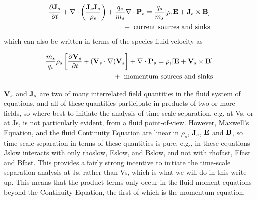\begin{eqnarray}
{\partial {\bf J}_{s} \over \partial t} + \nabla \cdot \left( {{\bf J}_{s} {\bf J}_{s} \over \rho_{s}} \right)
+ {q_{s} \over m_{s}} \nabla \cdot {\mathbf P}_{s} = {q_{s} \over m_{s}} [\rho_{s} {\bf E} + {\bf J}_{s}
\times {\bf B}] \nonumber \\ 
{} + \mbox{~current sources and sinks}
\end{eqnarray}
which can also be written in terms of the species fluid velocity as

\begin{eqnarray}
{m_{s} \over q_{s}} \rho_{s} \left[ {\partial {\bf V}_{s} \over \partial t} +
({\bf V}_{s} \cdot \nabla) {\bf V}_{s} \right] + \nabla \cdot {\mathbf P}_{s} =
\rho_{s}[{\bf E} + {\bf V}_{s} \times {\bf B}] \nonumber \\ 
{} + \mbox{~momentum sources and sinks}
\end{eqnarray} 

${\bf V}_{s}$ and ${\bf J}_{s}$ are two of many interrelated field quantities in the fluid system of 
equations, and all of these quantities participate in products of two or more fields, so where best to 
initiate the analysis of time-scale separation, e.g. at Vs, or at Js, is not particularly evident, from 
a fluid point-of-view. However, Maxwell’s Equation, and the fluid Continuity Equation are linear in $\rho_{s}$, 
${\bf J}_{s}$, ${\bf E}$ and ${\bf B}$, so time-scale separation in terms of these quantities is pure, 
e.g., in these equations Jslow interacts with only rhoslow, Eslow, and Bslow, and not with rhofast, 
Efast and Bfast. This provides a fairly strong incentive to initiate the time-scale separation 
analysis at Js, rather than Vs, which is what we will do in this write-up. This means that the 
product terms only occur in the fluid moment equations beyond the Continuity Equation, the first of 
which is the momentum equation.



